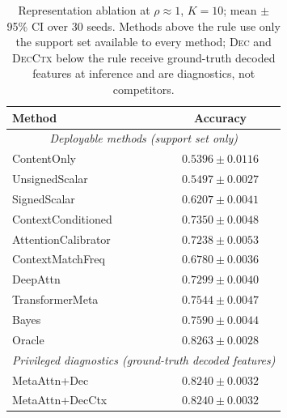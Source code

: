 \begin{table}[h]
\centering
\footnotesize
\caption{Representation ablation at $\rho \approx 1$, $K=10$; mean $\pm$ 95\% CI over 30 seeds. Methods above the rule use only the support set available to every method; \textsc{Dec} and \textsc{DecCtx} below the rule receive ground-truth decoded features at inference and are diagnostics, not competitors.}
\label{tab:ablation}
\begin{tabular}{lc}
\toprule
Method & Accuracy \\
\midrule
\multicolumn{2}{c}{\textit{Deployable methods (support set only)}} \\
\midrule
ContentOnly & $0.5396 \pm 0.0116$ \\
UnsignedScalar & $0.5497 \pm 0.0027$ \\
SignedScalar & $0.6207 \pm 0.0041$ \\
ContextConditioned & $0.7350 \pm 0.0048$ \\
AttentionCalibrator & $0.7238 \pm 0.0053$ \\
ContextMatchFreq & $0.6780 \pm 0.0036$ \\
DeepAttn & $0.7299 \pm 0.0040$ \\
TransformerMeta & $0.7544 \pm 0.0047$ \\
Bayes & $0.7590 \pm 0.0044$ \\
Oracle & $0.8263 \pm 0.0028$ \\
\midrule
\multicolumn{2}{c}{\textit{Privileged diagnostics (ground-truth decoded features)}} \\
\midrule
MetaAttn+Dec & $0.8240 \pm 0.0032$ \\
MetaAttn+DecCtx & $0.8240 \pm 0.0032$ \\
\bottomrule
\end{tabular}
\end{table}

